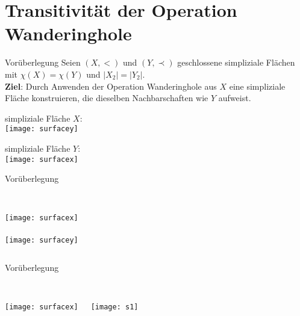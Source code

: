 \documentclass{beamer}
\begin{document}
\section{Transitivität der Operation Wanderinghole}
\begin{frame}{Vorüberlegung}
 Seien $(X,<)$ und $(Y,\prec)$ geschlossene simpliziale Flächen mit $\chi(X)=\chi(Y)$ und $\vert X_2 \vert =\vert Y_2 \vert $.\\\pause
 \textbf{Ziel}: Durch Anwenden der Operation Wanderinghole aus $X$ eine simpliziale Fläche konstruieren, die dieselben Nachbarschaften wie $Y$ aufweist.
\end{frame}
\begin{frame}
simpliziale Fläche $X$:\\
\texttt{[image: surfacey]}
\end{frame}
\begin{frame}
simpliziale Fläche $Y$:\\
\texttt{[image: surfacex]}
\end{frame}
\begin{frame}{{Vorüberlegung}}
\begin{columns}
   \\
    \texttt{[image: surfacex]}\\
 
    \\
    \texttt{[image: surfacey]}
    
\end{columns}
\end{frame}
\begin{frame}{{Vorüberlegung}}
\begin{columns}
   \\
    \texttt{[image: surfacex]}
 
    \\
    \texttt{[image: s1]}
\end{columns}
\end{frame}
\end{document}

